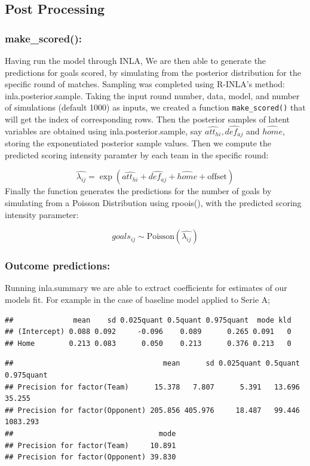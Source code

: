 \documentclass[
]{article}
\begin{document}
\hypertarget{post-processing}{%
\subsection{Post Processing}\label{post-processing}}

\hypertarget{make_scored}{%
\subsubsection{make\_scored():}\label{make_scored}}

Having run the model through INLA, We are then able to generate the
predictions for goals scored, by simulating from the posterior
distribution for the specific round of matches. Sampling was completed
using R-INLA's method: inla.posterior.sample. Taking the input round
number, data, model, and number of simulations (default 1000) as inputs,
we created a function \texttt{make\_scored()} that will get the index of
corresponding rows. Then the posterior samples of latent variables are
obtained using inla.posterior.sample, say
\(\hat{att_{hi}},\hat{def_{aj}}\) and \(\hat{home}\), storing the
exponentiated posterior sample values. Then we compute the predicted
scoring intensity paramter by each team in the specific round:

\[\hat{\lambda_{ij}} = \exp(\hat{att_{hi}} + \hat{def_{aj}} + \hat{home} + \text{offset})\]
Finally the function generates the predictions for the number of goals
by simulating from a Poisson Distribution using rpoois(), with the
predicted scoring intensity parameter:

\[goals_{ij} \sim  \text{Poisson} ( \hat{\lambda_{ij}} )\]

\hypertarget{outcome-predictions}{%
\subsubsection{Outcome predictions:}\label{outcome-predictions}}

Running inla.summary we are able to extract coefficients for estimates
of our models fit. For example in the case of baseline model applied to
Serie A;

\begin{verbatim}
##              mean    sd 0.025quant 0.5quant 0.975quant  mode kld
## (Intercept) 0.088 0.092     -0.096    0.089      0.265 0.091   0
## Home        0.213 0.083      0.050    0.213      0.376 0.213   0
\end{verbatim}

\begin{verbatim}
##                                   mean      sd 0.025quant 0.5quant 0.975quant
## Precision for factor(Team)      15.378   7.807      5.391   13.696     35.255
## Precision for factor(Opponent) 205.856 405.976     18.487   99.446   1083.293
##                                  mode
## Precision for factor(Team)     10.891
## Precision for factor(Opponent) 39.830
\end{verbatim}
\end{document}
